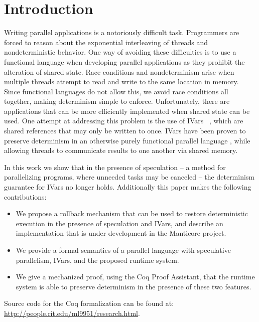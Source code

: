 
\section{Introduction}

Writing parallel applications is a notoriously difficult task.  Programmers are forced to reason about the exponential interleaving of threads and nondeterministic behavior. One way of avoiding these difficulties is to use a functional language when developing parallel applications as they prohibit the alteration of shared state.  Race conditions and nondeterminism arise when multiple threads attempt to read and write to the same location in memory.  Since functional languages do not allow this, we avoid race conditions all together, making determinism simple to enforce.  Unfortunately, there are applications that can be more efficiently implemented when shared state can be used.  One attempt at addressing this problem is the use of IVars ~\cite{i-structures}, which are shared references that may only be written to once.  IVars have been proven to preserve determinism in an otherwise purely functional parallel language \cite{par-monad, cnc}, while allowing threads to communicate results to one another via shared memory.

In this work we show that in the presence of speculation -- a method for parallelizing programs, where unneeded tasks may be canceled -- the determinism guarantee for IVars no longer holds. Additionally this paper makes the following contributions:

\begin{itemize}
\item We propose a rollback mechanism that can be used to restore deterministic execution in the presence of speculation and IVars, and describe an implementation that is under development in the Manticore project.

\item We provide a formal semantics of a parallel language with speculative parallelism, IVars, and the proposed runtime system.

\item We give a mechanized proof, using the Coq Proof Assistant, that the runtime system is able to preserve determinism in the presence of these two features.

\end{itemize}

Source code for the Coq formalization can be found at: \url{http://people.rit.edu/ml9951/research.html}.

